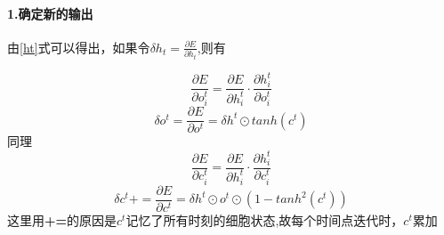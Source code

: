 \documentclass[UTF8]{ctexart}
\begin{document}
\paragraph*{1.确定新的输出}
由\ref{ht}式可以得出，如果令$\delta h_t = \frac{\partial E}{\partial h_t}$,则有

\begin{equation}
\frac{\partial E}{\partial o_i^t} = \frac{\partial E}{\partial h_i^t} \cdot \frac{\partial h_i^t}{\partial o_i^t} 
\end{equation}
\begin{equation}
\delta o^t = \frac{\partial E}{\partial o^t} =\delta h^t \odot tanh(c^t)  
\end{equation}
同理
\begin{equation}
\frac{\partial E}{\partial c_i^t} = \frac{\partial E}{\partial h_i^t} \cdot \frac{\partial h_i^t}{\partial c_i^t}
\end{equation}
\begin{equation}
\delta c^t  += \frac{\partial E}{\partial c^t} =\delta h^t \odot o^t \odot (1 - tanh^2(c^t))
\end{equation}
这里用\textbf{+=}的原因是$c^t$记忆了所有时刻的细胞状态,故每个时间点迭代时，$c^t$累加
\end{document}
